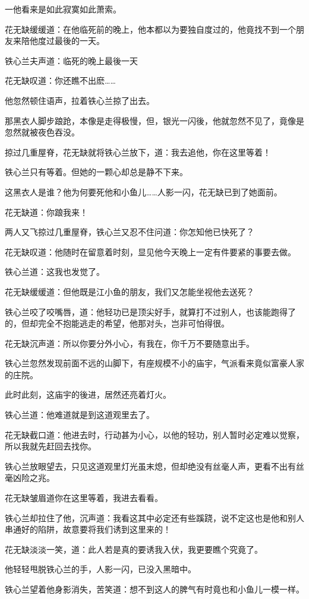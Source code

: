 \documentclass[12pt,oneside]{book}
\begin{document}
一他看来是如此寂寞如此萧索。

花无缺缓缓道：在他临死前的晚上，他本都以为要独自度过的，他竟找不到一个朋友来陪他度过最後的一天。

铁心兰夫声道：临死的晚上最後一天

花无缺叹道：你还瞧不出麽\ldots\ldots{}

他忽然顿住语声，拉着铁心兰掠了出去。

那黑衣人脚步踉跄，本像是走得极慢，但，银光一闪後，他就忽然不见了，竟像是忽然就被夜色吞没。

掠过几重屋脊，花无缺就将铁心兰放下，道：我去追他，你在这里等着！

铁心兰只有等着。但她的一颗心却总是静不下来。

这黑衣人是谁？他为何要死他和小鱼儿\ldots\ldots 人影一闪，花无缺已到了她面前。

花无缺道：你踉我来！

两人又飞掠过几重屋脊，铁心兰又忍不住问道：你怎知他已快死了？

花无缺叹道：他随时在留意着时刻，显见他今天晚上一定有件要紧的事要去做。

铁心兰道：这我也发觉了。

花无缺缓缓道：但他既是江小鱼的朋友，我们又怎能坐视他去送死？

铁心兰咬了咬嘴唇，道：他轻功已是顶尖好手，就算打不过别人，也该能跑得了的，但却完全不抱能逃走的希望，他那对头，岂非可怕得很。

花无缺沉声道：所以你要分外小心，有我在，你千万不要随意出手。

铁心兰忽然发现前面不远的山脚下，有座规模不小的庙宇，气派看来竟似富豪人家的庄院。

此时此刻，这庙宇的後进，居然还亮着灯火。

铁心兰道：他难道就是到这道观里去了。

花无缺截口道：他进去时，行动甚为小心，以他的轻功，别人暂时必定难以觉察，所以我就先赶回去找你。

铁心兰放眼望去，只见这道观里灯光虽末熄，但却绝没有丝毫人声，更看不出有丝毫凶险之兆。

花无缺皱眉道你在这里等着，我进去看看。

铁心兰却拉住了他，沉声道：我看这其中必定还有些蹊跷，说不定这也是他和别人串通好的陷阱，故意要将我们诱到这里来的！

花无缺淡淡一笑，道：此人若是真的要诱我入伏，我更要瞧个究竟了。

他轻轻甩脱铁心兰的手，人影一闪，已没入黑暗中。

铁心兰望着他身影消失，苦笑道：想不到这人的脾气有时竟也和小鱼儿一模一样。
\end{document}
